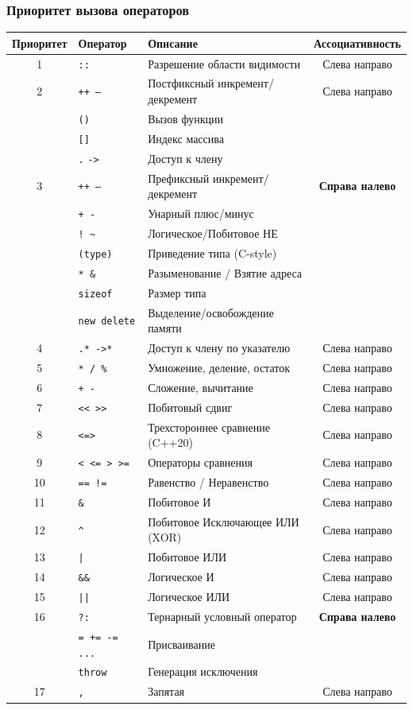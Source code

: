 \subsubsection{Приоритет вызова операторов}
\begin{center}
\begin{tabular}{|c|l|l|c|}
\hline
\textbf{Приоритет} & \textbf{Оператор} & \textbf{Описание} & \textbf{Ассоциативность} \\
\hline
1 & \texttt{::} & Разрешение области видимости & Слева направо \\
\hline
2 & \texttt{++ --} & Постфиксный инкремент/декремент & Слева направо \\
  & \texttt{()} & Вызов функции & \\
  & \texttt{[]} & Индекс массива & \\
  & \texttt{.} \texttt{->} & Доступ к члену & \\
\hline
3 & \texttt{++ --} & Префиксный инкремент/декремент & \textbf{Справа налево} \\
  & \texttt{+ -} & Унарный плюс/минус & \\
  & \texttt{! \~} & Логическое/Побитовое НЕ & \\
  & \texttt{(type)} & Приведение типа (C-style) & \\
  & \texttt{* \&} & Разыменование / Взятие адреса & \\
  & \texttt{sizeof} & Размер типа & \\
  & \texttt{new delete} & Выделение/освобождение памяти & \\
\hline
4 & \texttt{.* ->*} & Доступ к члену по указателю & Слева направо \\
\hline
5 & \texttt{* / \%} & Умножение, деление, остаток & Слева направо \\
\hline
6 & \texttt{+ -} & Сложение, вычитание & Слева направо \\
\hline
7 & \texttt{<< >>} & Побитовый сдвиг & Слева направо \\
\hline
8 & \texttt{<=>} & Трехстороннее сравнение (C++20) & Слева направо \\
\hline
9 & \texttt{< <= > >=} & Операторы сравнения & Слева направо \\
\hline
10 & \texttt{== !=} & Равенство / Неравенство & Слева направо \\
\hline
11 & \texttt{\&} & Побитовое И & Слева направо \\
\hline
12 & \texttt{\^} & Побитовое Исключающее ИЛИ (XOR) & Слева направо \\
\hline
13 & \texttt{|} & Побитовое ИЛИ & Слева направо \\
\hline
14 & \texttt{\&\&} & Логическое И & Слева направо \\
\hline
15 & \texttt{||} & Логическое ИЛИ & Слева направо \\
\hline
16 & \texttt{?:} & Тернарный условный оператор & \textbf{Справа налево} \\
   & \texttt{= += -= ...} & Присваивание & \\
   & \texttt{throw} & Генерация исключения & \\
\hline
17 & \texttt{,} & Запятая & Слева направо \\
\hline
\end{tabular}
\end{center}
